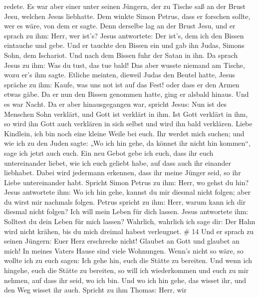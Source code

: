 redete.  Es war aber einer unter seinen Jüngern, der zu
Tische saß an der Brust Jesu, welchen Jesus liebhatte.  Dem
winkte Simon Petrus, dass er forschen sollte, wer es wäre, von dem er
sagte.  Denn derselbe lag an der Brust Jesu, und er sprach
zu ihm: Herr, wer ist's?  Jesus antwortete: Der ist's, dem
ich den Bissen eintauche und gebe. Und er tauchte den Bissen ein und gab
ihn Judas, Simons Sohn, dem Ischariot.  Und nach dem Bissen
fuhr der Satan in ihn. Da sprach Jesus zu ihm: Was du tust, das tue
bald!  Das aber wusste niemand am Tische, wozu er's ihm
sagte.  Etliche meinten, dieweil Judas den Beutel hatte,
Jesus spräche zu ihm: Kaufe, was uns not ist auf das Fest! oder dass er
den Armen etwas gäbe.  Da er nun den Bissen genommen hatte,
ging er alsbald hinaus. Und es war Nacht.  Da er aber
hinausgegangen war, spricht Jesus: Nun ist des Menschen Sohn verklärt,
und Gott ist verklärt in ihm.  Ist Gott verklärt in ihm, so
wird ihn Gott auch verklären in sich selbst und wird ihn bald verklären.
 Liebe Kindlein, ich bin noch eine kleine Weile bei euch.
Ihr werdet mich suchen; und wie ich zu den Juden sagte: „Wo ich hin
gehe, da könnet ihr nicht hin kommen``, sage ich jetzt auch euch.
 Ein neu Gebot gebe ich euch, dass ihr euch untereinander
liebet, wie ich euch geliebt habe, auf dass auch ihr einander liebhabet.
 Dabei wird jedermann erkennen, dass ihr meine Jünger seid,
so ihr Liebe untereinander habt.  Spricht Simon Petrus zu
ihm: Herr, wo gehst du hin? Jesus antwortete ihm: Wo ich hin gehe,
kannst du mir diesmal nicht folgen; aber du wirst mir nachmals folgen.
 Petrus spricht zu ihm: Herr, warum kann ich dir diesmal
nicht folgen? Ich will mein Leben für dich lassen.  Jesus
antwortete ihm: Solltest du dein Leben für mich lassen? Wahrlich,
wahrlich ich sage dir: Der Hahn wird nicht krähen, bis du mich dreimal
habest verleugnet. \# 14  Und er sprach zu seinen Jüngern:
Euer Herz erschrecke nicht! Glaubet an Gott und glaubet an mich!
 In meines Vaters Hause sind viele Wohnungen. Wenn's nicht
so wäre, so wollte ich zu euch sagen: Ich gehe hin, euch die Stätte zu
bereiten.  Und wenn ich hingehe, euch die Stätte zu
bereiten, so will ich wiederkommen und euch zu mir nehmen, auf dass ihr
seid, wo ich bin.  Und wo ich hin gehe, das wisset ihr, und
den Weg wisset ihr auch.  Spricht zu ihm Thomas: Herr, wir
